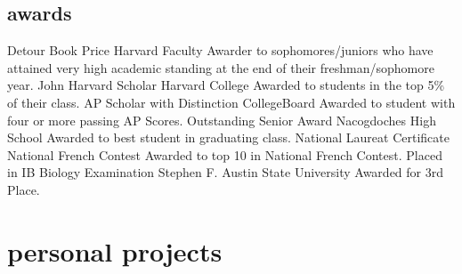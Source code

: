 \documentclass[]{friggeri-cv} %
\begin{document}
\begin{detailed}
\section{awards}

\begin{entrylist}
{Detour Book Price}
{Harvard Faculty}
{Awarder to sophomores/juniors who have attained very high academic standing at the end of their freshman/sophomore year.}
{John Harvard Scholar}
{Harvard College}
{Awarded to students in the top 5\% of their class.}
{AP Scholar with Distinction}
{CollegeBoard}
{Awarded to student with four or more passing AP Scores.}
{Outstanding Senior Award}
{Nacogdoches High School}
{Awarded to best student in graduating class.}
{National Laureat Certificate}
{National French Contest}
{Awarded to top 10 in National French Contest.}
{Placed in IB Biology Examination}
{Stephen F. Austin State University}
{Awarded for 3rd Place.}
\end{entrylist}
\end{detailed}



\section{personal projects}
\end{document}

